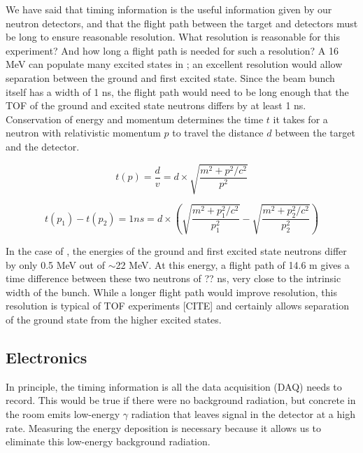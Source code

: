 
We have said that timing information is the useful information given by our neutron detectors, and that the flight path between the target and detectors must be long to ensure reasonable resolution.  What resolution is reasonable for this experiment?  And how long a flight path is needed for such a resolution?  A 16 MeV  can populate many excited states in \GeTargets; an excellent resolution would allow separation between the ground and first excited state.  Since the beam bunch itself has a width of 1 ns, the flight path would need to be long enough that the TOF of the ground and excited state neutrons differs by at least 1 ns. Conservation of energy and momentum determines the time $t$ it takes for a neutron with relativistic momentum $p$ to travel the distance $d$ between the target and the detector.


\begin{equation}
t(p) = \frac{d}{v} = d\times\sqrt{\frac{m^2+p^2/c^2}{p^2}}
\end{equation}

\begin{equation}
t(p_1) - t(p_2) = 1 ns = d\times(\sqrt{\frac{m^2+p_1^2/c^2}{p_1^2}}-\sqrt{\frac{m^2+p_2^2/c^2}{p_2^2}})
\label{eq:TOF}
\end{equation}

In the case of ,  the energies of the ground and first excited state neutrons differ by only 0.5 MeV out of $\sim$22 MeV.  At this energy, a flight path of 14.6 m gives a time difference between these two neutrons of ?? ns, very close to the intrinsic width of the bunch.  While a longer flight path would improve resolution, this resolution is typical of TOF experiments [CITE] and certainly allows separation of the ground state from the higher excited states.  

\subsection{Electronics}

In principle, the timing information is all the data acquisition (DAQ) needs to record.  This would be true if there were no background radiation, but concrete in the room emits low-energy $\gamma$ radiation that leaves signal in the detector at a high rate.  Measuring the energy deposition is necessary because it allows us to eliminate this low-energy background radiation.

